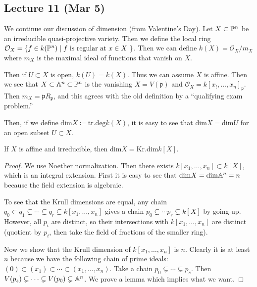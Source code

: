 \documentclass[twoside, 10pt]{article}
\begin{document}
    \subsection{Lecture 11 (Mar 5)}
    We continue our discussion of dimension (from Valentine's Day). Let $X \subset \P^n$ be an irreducible quasi-projective variety. Then we define the local ring $\mathcal{O}_X = \{f \in k(\P^n) \mid f \text{ is regular at $x \in X$ }\}$. Then we can define $k(X) = \mathcal{O}_X/m_X$ where $m_X$ is the maximal ideal of functions that vanish on $X$.

    Then if $U \subset X$ is open, $k(U) = k(X)$. Thus we can assume $X$ is affine. Then we see that $X \subset \A^n \subset \P^n$ is the vanishing $X = V(\mathfrak{p})$ and $\mathcal{O}_X = k[x_!, \ldots, x_n]_{\mathfrak{p}}$. Then $m_X = \mathfrak{p}R_{\mathfrak{p}}$, and this agrees with the old definition by a ``qualifying exam problem.''

    Then, if we define $\mathrm{dim} X \coloneqq \mathrm{tr.deg} k(X)$, it is easy to see that $\mathrm{dim} X = \mathrm{dim} U$ for an open subset $U \subset X$.

    \begin{thm}
        If $X$ is affine and irreducible, then $\mathrm{dim} X = \mathrm{Kr.dim} k[X]$.
        \begin{proof}
            We use Noether normalization. Then there exists $k[x_1, \ldots, x_n] \subset k[X]$, which is an integral extension. First it is easy to see that $\mathrm{dim}X = \mathrm{dim}\A^n = n$ because the field extension is algebraic.

            To see that the Krull dimensions are equal, any chain $q_0 \subset q_1 \subsetneq \cdots \subsetneq q_r \subsetneq k[x_1, \ldots, x_n]$ gives a chain $p_0 \subsetneq \cdots p_r \subsetneq k[X]$ by going-up. However, all $p_i$ are distinct, so their intersections with $k[x_1, \ldots, x_n]$ are distinct (quotient by $p_i$, then take the field of fractions of the smaller ring).

            Now we show that the Krull dimension of $k[x_1, \ldots, x_n]$ is $n$. Clearly it is at least $n$  because we have the following chain of prime ideals: $(0) \subset (x_1) \subset \cdots \subset (x_1, \ldots, x_n)$. Take a chain $p_0 \subsetneq \cdots \subsetneq p_s$. Then $V(p_s) \subsetneq \cdots \subsetneq V(p_0) \subsetneq \A^n$. We prove a lemma which implies what we want.
        \end{proof}
    \end{thm}
\end{document}
